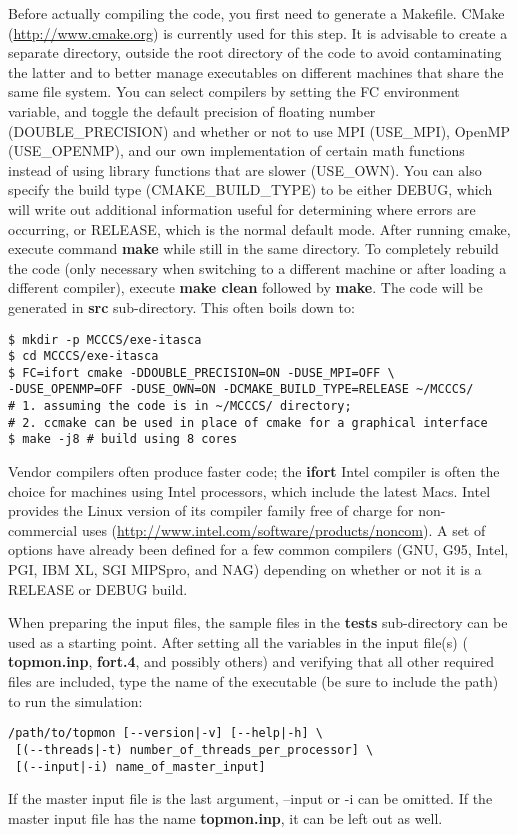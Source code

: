 \documentclass[12pt,letterpaper]{article}
\begin{document}
Before actually compiling the code, you first need to
generate a Makefile. CMake (\url{http://www.cmake.org}) is
currently used for this step. It is advisable to create a
separate directory, outside the root directory of the code
to avoid contaminating the latter and to better manage
executables on different machines that share the same file
system. You can select compilers by setting the FC
environment variable, and toggle the default precision of
floating number (DOUBLE\_PRECISION) and whether or not to
use MPI (USE\_MPI), OpenMP (USE\_OPENMP), and our own
implementation of certain math functions instead of using
library functions that are slower (USE\_OWN). You can also specify
the build type (CMAKE\_BUILD\_TYPE) to be either DEBUG, which will
write out additional information useful for determining where
errors are occurring, or RELEASE, which is the normal default mode. 
After running
cmake, execute command {\bf make} while still in the same
directory. To completely rebuild the code (only necessary
when switching to a different machine or after loading a
different compiler), execute {\bf make clean} followed by
{\bf make}. The code will be generated in {\bf src}
sub-directory. This often boils down to:
\begin{verbatim}
$ mkdir -p MCCCS/exe-itasca
$ cd MCCCS/exe-itasca
$ FC=ifort cmake -DDOUBLE_PRECISION=ON -DUSE_MPI=OFF \
-DUSE_OPENMP=OFF -DUSE_OWN=ON -DCMAKE_BUILD_TYPE=RELEASE ~/MCCCS/
# 1. assuming the code is in ~/MCCCS/ directory;
# 2. ccmake can be used in place of cmake for a graphical interface
$ make -j8 # build using 8 cores
\end{verbatim}

Vendor compilers often produce faster code; the {\bf ifort}
Intel compiler is often the choice for machines using Intel
processors, which include the latest Macs. Intel provides
the Linux version of its compiler family free of charge for
non-commercial uses
(\url{http://www.intel.com/software/products/noncom}). A set
of options have already been defined for a few common
compilers (GNU, G95, Intel, PGI, IBM XL, SGI MIPSpro, and
NAG) depending on whether or not it is a RELEASE or DEBUG build.

When preparing the input files, the sample files in the {\bf
  tests} sub-directory can be used as a starting point.
After setting all the variables in the input file(s) ({\bf
  topmon.inp}, {\bf fort.4}, and possibly others) and
verifying that all other required files are included, type
the name of the executable (be sure to include the path) to
run the simulation:
\begin{verbatim}
/path/to/topmon [--version|-v] [--help|-h] \
 [(--threads|-t) number_of_threads_per_processor] \
 [(--input|-i) name_of_master_input]
\end{verbatim}
If the master input file is the last argument, --input or -i
can be omitted. If the master input file has the name {\bf
  topmon.inp}, it can be left out as well.
\end{document}
